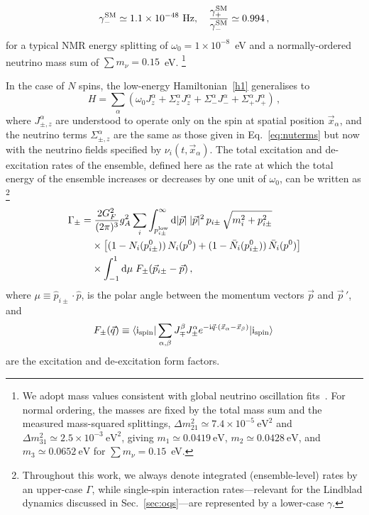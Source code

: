 \documentclass[aps,prd,10pt,twocolumn,superscriptaddress,floatfix,nofootinbib,amsmath,amssymb,altaffilletter,preprintnumbers]{revtex4-1}
\begin{document}
\begin{equation}
 \gamma_-^{\rm SM} \simeq 1.1\times 10^{-48}~{\rm Hz}, \quad \frac{\gamma_+^{\rm SM}}{\gamma_-^{\rm SM}}\simeq 0.994\,, 
 \label{eq:gammanumbers}
\end{equation} 
for  a typical NMR energy splitting of  $\omega_0=1 \times 10^{-8}$~eV and a normally-ordered neutrino mass sum of $\sum m_\nu=0.15$~eV.%
%
\footnote{We adopt mass values consistent with global neutrino oscillation fits~\cite{Esteban:2020cvm,deSalas:2020pgw,Capozzi:2017ipn}. 
For normal ordering, the masses are fixed by the total mass sum and the measured mass-squared splittings, $\Delta m_{21}^2 \simeq 7.4\times 10^{-5}~\mathrm{eV}^2$ and $\Delta m_{31}^2 \simeq 2.5\times 10^{-3}~\mathrm{eV}^2$, giving $m_1 \simeq 0.0419~\mathrm{eV}$, $m_2 \simeq 0.0428~\mathrm{eV}$, and $m_3 \simeq 0.0652~\mathrm{eV}$ for $\sum m_\nu = 0.15$~eV.}



In the case of $N$ spins, the low-energy Hamiltonian~\eqref{h1} generalises to 
\begin{equation}
H =\sum_\alpha \left( \omega_0 J_z^\alpha +\Sigma_z^\alpha J_z^\alpha +\Sigma_-^\alpha J_-^\alpha+\Sigma_+^\alpha J_+^\alpha \right)\, ,
\label{eq:Nham}
\end{equation}
where $J_{\pm,z}^\alpha$ are understood to operate only on the spin at spatial position $\vec{x}_\alpha$, and the neutrino terms $\Sigma^\alpha_{\pm,z}$ are the same as those given in Eq.~\eqref{eq:nuterms} but now with the neutrino fields specified by $\nu_i(t,\vec{x}_\alpha)$.  The total excitation and de-excitation rates of the ensemble, defined here as the rate at which the total energy of the ensemble increases or decreases by one unit of $\omega_0$, can be written as%
%
\footnote{Throughout this work, we always denote integrated (ensemble-level) rates by an upper-case $\Gamma$, while single-spin interaction rates---relevant for the Lindblad dynamics discussed in Sec.~\ref{sec:oqs}---are represented by a lower-case $\gamma$.}
%
\begin{equation}
\begin{aligned}
\Gamma_{\pm}
    =&\;\frac{ 2 G_F^2}{(2 \pi)^3}  g_A^2 \sum_i
    \int_{p^{\rm low}_{i\pm}}^\infty  {\rm d} |\vec{p}|\;|\vec{p}|^2\, p_{i\pm}\, \sqrt{m_i^2+p^2_{i \pm}} \\  
&\times   \left[(1-N_{i}(p^0_{i\pm})) \, N_{i}(p^0)  +(1-\bar{N}_{i}(p^0_{i\pm}))\, \bar{N}_{i}(p^0)\right] \\
& \times 
\int_{-1}^1 {\rm d} \mu \; F_\pm(\vec{p}_{i\pm}-\vec{p})\, ,
\label{eq:biggamma}
    \end{aligned}
\end{equation}
where $\mu \equiv \hat{p}_{i\pm} \cdot \hat{p}$, is the polar angle between the momentum vectors $\vec{p}$ and $\vec{p}\,'$, and 
\begin{equation}
F_\pm(\vec{q}) \equiv \langle {\rm i}_{\rm spin}| \sum_{\alpha,\beta} J_\mp^\beta J_\pm^\alpha e^{-{\rm i} \vec{q}\cdot (\vec{x}_\alpha-\vec{x}_\beta)}|{\rm i}_{\rm spin}\rangle\,
\label{eq:formfactormaintext}
\end{equation} 
are the excitation and de-excitation form factors.
\end{document}
